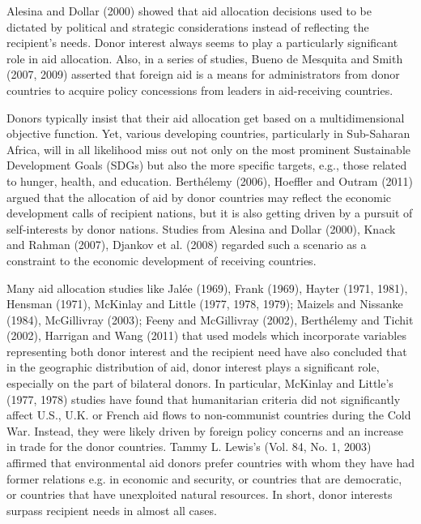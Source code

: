 \documentclass{swfuthesise}
\begin{document}
Alesina and Dollar (2000)\cite{alesina2000gives} showed that aid allocation decisions used to be dictated by political and strategic considerations instead of reflecting the recipient's needs. Donor interest always seems to play a particularly significant role in aid allocation. Also, in a series of studies, Bueno de Mesquita and Smith (2007, 2009)\cite{de2007foreign}\cite{de2009political} asserted that foreign aid is a means for administrators from donor countries to acquire policy concessions from leaders in aid-receiving countries. 

Donors typically insist that their aid allocation get based on a multidimensional objective function. Yet, various developing countries, particularly in Sub-Saharan Africa, will in all likelihood miss out not only on the most prominent Sustainable Development Goals (SDGs) but also the more specific targets, e.g., those related to hunger, health, and education. Berthélemy (2006)\cite{berthelemy2006aid}, Hoeffler and Outram (2011)\cite{hoeffler2011need} argued that the allocation of aid by donor countries may reflect the economic development calls of recipient nations, but it is also getting driven by a pursuit of self-interests by donor nations. Studies from Alesina and Dollar (2000)\cite{alesina2000gives}, Knack and Rahman (2007)\cite{knack2007donor}, Djankov et al. (2008)\cite{djankov2008curse} regarded such a scenario as a constraint to the economic development of receiving countries.  

Many aid allocation studies like Jalée (1969)\cite{nuti1969pillage}, Frank (1969)\cite{frank1969underdevelopment}, Hayter (1971, 1981)\cite{hayter1971aid}\cite{hayter1981creation}, Hensman (1971)\cite{hensman1971rich}, McKinlay and Little (1977, 1978, 1979)\cite{mckinlay1977foreign}\cite{mckinlay1978foreign}\cite{mckinlay1979aid}; Maizels and Nissanke (1984)\cite{maizels1984motivations}, McGillivray (2003)\cite{mcgillivray2003aid}; Feeny and McGillivray (2002)\cite{feeny2002modeling}, Berthélemy and Tichit (2002)\cite{berthelemy2002bilateral}, Harrigan and Wang (2011)\cite{harrigan2011new} that used models which incorporate variables representing both donor interest and the recipient need have also concluded that in the geographic distribution of aid, donor interest plays a significant role, especially on the part of bilateral donors. In particular, McKinlay and Little’s (1977, 1978)\cite{mckinlay1977foreign}\cite{mckinlay1978foreign} studies have found that humanitarian criteria did not significantly affect U.S., U.K. or French aid flows to non-communist countries during the Cold War. Instead, they were likely driven by foreign policy concerns and an increase in trade for the donor countries. Tammy L. Lewis’s (Vol. 84, No. 1, 2003)\cite{lewis2003environmental} affirmed that environmental aid donors prefer countries with whom they have had former relations e.g. in economic and security, or countries that are democratic, or countries that have unexploited natural resources. In short, donor interests surpass recipient needs in almost all cases. 
\end{document}
